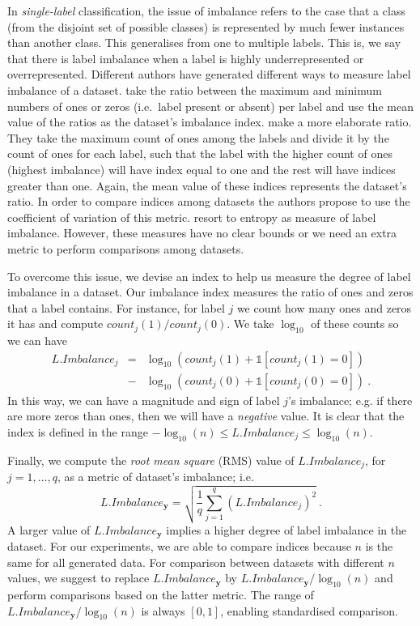 \documentclass[review]{elsarticle}
\begin{document}
	In \emph{single-label} classification, the issue of imbalance refers to the case that a class (from the disjoint set of possible classes) is represented by much fewer instances than another class. This generalises from one to multiple labels. This is, we say that there is label imbalance when a label is highly underrepresented or overrepresented. Different authors have generated different ways to measure label imbalance of a dataset. \citet{LIEG1} take the ratio between the maximum and minimum numbers of ones or zeros (i.e.~label present or absent) per label and use the mean value of the ratios as the dataset's imbalance index. \citet{LIEG2} make a more elaborate ratio. They take the maximum count of ones among the labels and divide it by the count of ones for each label, such that the label with the higher count of ones (highest imbalance) will have index equal to one and the rest will have indices greater than one. Again, the mean value of these indices represents the dataset's ratio. In order to compare indices among datasets the authors propose to use the coefficient of variation of this metric. \citet{LIEG3} resort to entropy as measure of label imbalance. However, these measures have no clear bounds or we need an extra metric to perform comparisons among datasets.
	
	To overcome this issue, we devise an index to help us measure the degree of label imbalance in a dataset. Our imbalance index measures the ratio of ones and zeros that a label contains. For instance, for label $j$ we count how many ones and zeros it has and compute $count_{j}(1)/count_{j}(0)$. We take $\log_{10}$ of these counts so we can have
	\begin{eqnarray} \nonumber
	L.Imbalance_{j} &=& \log_{10}(count_{j}(1) + \mathds{1}[count_{j}(1) = 0]) \\  &-& \log_{10}(count_{j}(0) + \mathds{1}[count_{j}(0) = 0])\ .
	\end{eqnarray}
	In this way, we can have a magnitude and sign of label $j$'s imbalance; e.g. if there are more zeros than ones, then we will have a \emph{negative} value. It is clear that the index is defined in the range $-\log_{10}(n) \leq L.Imbalance_{j} \leq \log_{10}(n)$. 
	
	Finally, we compute the \emph{root mean square} (RMS) value of $L.Imbalance_{j}$, for $j=1,\ldots,q$, as a metric of dataset's imbalance; i.e.
	\begin{equation}\label{LIMB}
	L.Imbalance_{\mathbf{y}} = \sqrt{\frac{1}{q} \sum^{q}_{j=1}{\left( L.Imbalance_{j} \right)^{2} }}\ .
	\end{equation}
	A larger value of $L.Imbalance_{\mathbf{y}}$ implies a higher degree of label imbalance in the dataset. For our experiments, we are able to compare indices because $n$ is the same for all generated data. For comparison between datasets with different $n$ values, we suggest to replace $L.Imbalance_{\mathbf{y}}$ by $L.Imbalance_{\mathbf{y}}/\log_{10}(n)$ and perform comparisons based on the latter metric. The range of $L.Imbalance_{\mathbf{y}}/\log_{10}(n)$ is always $[0,1]$, enabling standardised comparison.
	
\end{document}
